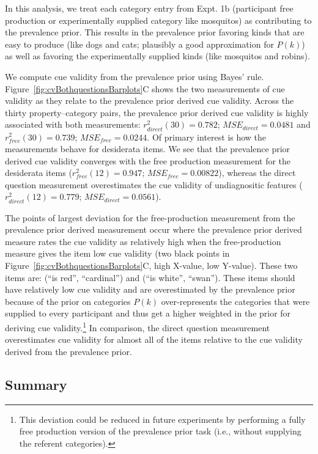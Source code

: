 \documentclass[english,,man,floatsintext]{apa6}
\let\rmarkdownfootnote\footnote%
\def\footnote{\protect\rmarkdownfootnote}
\theoremstyle{definition}
\theoremstyle{definition}
\theoremstyle{definition}
\theoremstyle{remark}
\begin{document}
In this analysis, we treat each category entry from Expt. 1b
(participant free production or experimentally supplied category like
mosquitos) as contributing to the prevalence prior. This results in the
prevalence prior favoring kinds that are easy to produce (like dogs and
cats; plausibly a good approximation for \(P(k)\)) as well as favoring
the experimentally supplied kinds (like mosquitos and robins).

We compute cue validity from the prevalence prior using Bayes' rule.
Figure~\ref{fig:cvBothquestionsBarplots}C shows the two measurements of
cue validity as they relate to the prevalence prior derived cue
validity. Across the thirty property--category pairs, the prevalence
prior derived cue validity is highly associated with both measurements:
\(r_{direct}^2(30) = 0.782\); \(MSE_{direct} = 0.0481\) and
\(r_{free}^2(30) = 0.739\); \(MSE_{free} = 0.0244\). Of primary interest
is how the measurements behave for desiderata items. We see that the
prevalence prior derived cue validity converges with the free production
measurement for the desiderata items (\(r_{free}^2(12) = 0.947\);
\(MSE_{free} = 0.00822\)), whereas the direct question measurement
overestimates the cue validity of undiagnositic features
(\(r_{direct}^2(12) = 0.779\); \(MSE_{direct} = 0.0561\)).

The points of largest deviation for the free-production measurement from
the prevalence prior derived measurement occur where the prevalence
prior derived measure rates the cue validity as relatively high when the
free-production measure gives the item low cue validity (two black
points in Figure~\ref{fig:cvBothquestionsBarplots}C, high X-value, low
Y-value). These two items are: (\enquote{is red}, \enquote{cardinal})
and (\enquote{is white}, \enquote{swan}). These items should have
relatively low cue validity and are overestimated by the prevalence
prior because of the prior on categories \(P(k)\) over-represents the
categories that were supplied to every participant and thus get a higher
weighted in the prior for deriving cue validity.\footnote{This deviation
  could be reduced in future experiments by performing a fully free
  production version of the prevalence prior task (i.e., without
  supplying the referent categories).} In comparison, the direct
question measurement overestimates cue validity for almost all of the
items relative to the cue validity derived from the prevalence prior.

\hypertarget{summary}{%
\subsection{Summary}\label{summary}}
\end{document}
